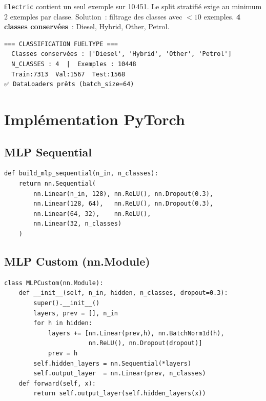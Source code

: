 \documentclass[12pt,a4paper]{report}
\begin{document}
\begin{warningbox}
\texttt{Electric} contient un seul exemple sur 10\,451. Le split
stratifié exige au minimum 2 exemples par classe. Solution~: filtrage
des classes avec $<10$ exemples. \textbf{4 classes conservées}~:
Diesel, Hybrid, Other, Petrol.
\end{warningbox}

\begin{outputbox}
\begin{verbatim}
=== CLASSIFICATION FUELTYPE ===
  Classes conservées : ['Diesel', 'Hybrid', 'Other', 'Petrol']
  N_CLASSES : 4  |  Exemples : 10448
  Train:7313  Val:1567  Test:1568
✅ DataLoaders prêts (batch_size=64)
\end{verbatim}
\end{outputbox}

\section{Implémentation PyTorch}

\subsection{MLP Sequential}
\begin{lstlisting}[caption=MLP avec nn.Sequential]
def build_mlp_sequential(n_in, n_classes):
    return nn.Sequential(
        nn.Linear(n_in, 128), nn.ReLU(), nn.Dropout(0.3),
        nn.Linear(128, 64),   nn.ReLU(), nn.Dropout(0.3),
        nn.Linear(64, 32),    nn.ReLU(),
        nn.Linear(32, n_classes)
    )
\end{lstlisting}

\subsection{MLP Custom (nn.Module)}
\begin{lstlisting}[caption=MLP Custom héritant nn.Module avec BatchNorm]
class MLPCustom(nn.Module):
    def __init__(self, n_in, hidden, n_classes, dropout=0.3):
        super().__init__()
        layers, prev = [], n_in
        for h in hidden:
            layers += [nn.Linear(prev,h), nn.BatchNorm1d(h),
                       nn.ReLU(), nn.Dropout(dropout)]
            prev = h
        self.hidden_layers = nn.Sequential(*layers)
        self.output_layer  = nn.Linear(prev, n_classes)
    def forward(self, x):
        return self.output_layer(self.hidden_layers(x))
\end{lstlisting}
\end{document}
